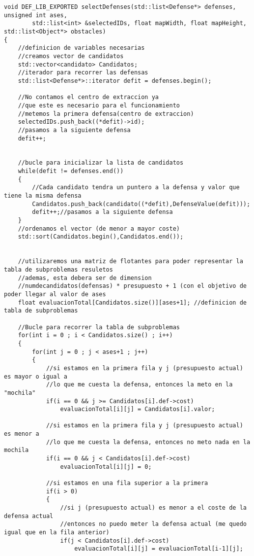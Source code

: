 \begin{lstlisting}[frame=single,basicstyle=\tiny,title={Algoritmo para rellenar la tabla de subproblemas resueltos}]
void DEF_LIB_EXPORTED selectDefenses(std::list<Defense*> defenses, unsigned int ases, 
		std::list<int> &selectedIDs, float mapWidth, float mapHeight, std::list<Object*> obstacles)             
{
    //definicion de variables necesarias
    //creamos vector de candidatos
    std::vector<candidato> Candidatos; 
    //iterador para recorrer las defensas
    std::list<Defense*>::iterator defit = defenses.begin(); 
    
    //No contamos el centro de extraccion ya 
    //que este es necesario para el funcionamiento
    //metemos la primera defensa(centro de extraccion)
    selectedIDs.push_back((*defit)->id);
    //pasamos a la siguiente defensa
    defit++;


    //bucle para inicializar la lista de candidatos
    while(defit != defenses.end()) 
    {   
     	//Cada candidato tendra un puntero a la defensa y valor que tiene la misma defensa
        Candidatos.push_back(candidato((*defit),DefenseValue(defit)));
        defit++;//pasamos a la siguiente defensa
    }
    //ordenamos el vector (de menor a mayor coste)
    std::sort(Candidatos.begin(),Candidatos.end());
    

    //utilizaremos una matriz de flotantes para poder representar la tabla de subproblemas resuletos
    //ademas, esta debera ser de dimension 
    //numdecandidatos(defensas) * presupuesto + 1 (con el objetivo de poder llegar al valor de ases
    float evaluacionTotal[Candidatos.size()][ases+1]; //definicion de tabla de subproblemas

	//Bucle para recorrer la tabla de subproblemas
    for(int i = 0 ; i < Candidatos.size() ; i++)
    {
        for(int j = 0 ; j < ases+1 ; j++)
        {
        	//si estamos en la primera fila y j (presupuesto actual) es mayor o igual a 
        	//lo que me cuesta la defensa, entonces la meto en la "mochila"
            if(i == 0 && j >= Candidatos[i].def->cost)	
                evaluacionTotal[i][j] = Candidatos[i].valor;
                
            //si estamos en la primera fila y j (presupuesto actual) es menor a
            //lo que me cuesta la defensa, entonces no meto nada en la mochila
            if(i == 0 && j < Candidatos[i].def->cost)
                evaluacionTotal[i][j] = 0;
                
            //si estamos en una fila superior a la primera
            if(i > 0)
            {
            	//si j (presupuesto actual) es menor a el coste de la defensa actual
            	//entonces no puedo meter la defensa actual (me quedo igual que en la fila anterior)
                if(j < Candidatos[i].def->cost)
                    evaluacionTotal[i][j] = evaluacionTotal[i-1][j];
                    

\end{lstlisting}
